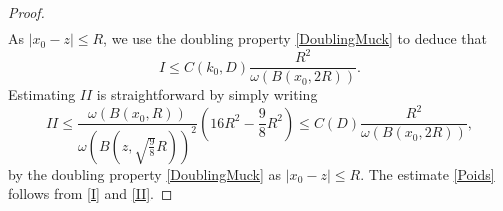 \documentclass[10pt,a4paper]{amsart}
\begin{document}
\begin{proof}
\begin{align*}
\end{align*}
As $|x_0-z| \leq R$, we use the doubling property \eqref{DoublingMuck} to deduce that
\begin{equation}\label{I}
     I \leq C(k_0,D) \frac{R^2}{\omega(B(x_0,2R))}.
\end{equation}
Estimating $II$ is straightforward by simply writing  
\begin{equation}\label{II}
    II \leq \frac{\omega(B(x_0,R))}{\omega(B(z,\sqrt{\frac{9}{8}}R))^2} \left ( 16R^2- \frac{9}{8}R^2 \right ) \leq C(D) \frac{R^2}{\omega(B(x_0,2R))},
\end{equation}
by the doubling property \eqref{DoublingMuck} as $|x_0-z| \leq R$. The estimate \eqref{Poids} follows from \eqref{I} and \eqref{II}. 
\end{proof}
\end{document}
